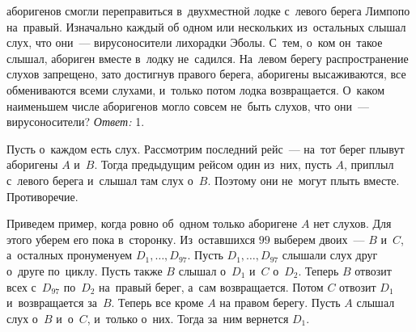  аборигенов смогли переправиться в~двухместной лодке с~левого берега Лимпопо
на~правый.
Изначально каждый об одном или нескольких из~остальных слышал слух, что они~---
вирусоносители лихорадки Эболы.
С~тем, о~ком он~такое слышал, абориген вместе в~лодку не~садился.
На~левом берегу распространение слухов запрещено, зато достигнув правого
берега, аборигены высаживаются, все обмениваются всеми слухами, и~только потом
лодка возвращается.
О~каком наименьшем числе аборигенов могло совсем не~быть слухов, что они~---
вирусоносители?
\solution
\emph{Ответ:} 1.
\par
Пусть о~каждом есть слух.
Рассмотрим последний рейс~--- на~тот берег плывут аборигены $A$ и~$B$.
Тогда предыдущим рейсом один из~них, пусть $A$, приплыл с~левого берега и~слышал
там слух о~$B$.
Поэтому они не~могут плыть вместе.
Противоречие.
\par
Приведем пример, когда ровно об~одном только аборигене $A$ нет слухов.
Для этого уберем его пока в~сторонку.
Из~оставшихся $99$ выберем двоих~--- $B$ и~$C$, а~осталных пронуменуем $D_{1}, \ldots, D_{97}$.
Пусть $D_{1}, \ldots, D_{97}$ слышали слух друг о~друге по~циклу.
Пусть также $B$ слышал о~$D_1$ и~$C$ о~$D_2$.
Теперь $B$ отвозит всех с~$D_{97}$ по~$D_2$ на~правый берег, а~сам возвращается.
Потом $C$ отвозит $D_1$ и~возвращается за~$B$.
Теперь все кроме $A$ на правом берегу.
Пусть $A$ слышал слух о~$B$ и~о~$C$, и~только о~них.
Тогда за~ним вернется $D_1$.
\endproblem
